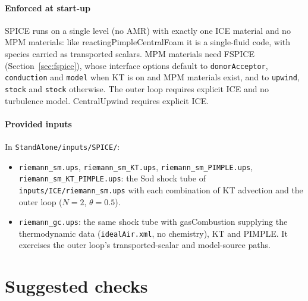 \documentclass[11pt]{article}
\newcommand{\code}[1]{\texttt{\small #1}}
\newcommand{\file}[1]{\texttt{\small\color{Moss}#1}}
\begin{document}
\paragraph{Enforced at start-up}
SPICE runs on a single level (no AMR) with exactly one ICE material and no MPM materials: like
reactingPimpleCentralFoam it is a single-fluid code, with species carried as transported scalars.
MPM materials need FSPICE (Section~\ref{sec:fspice}), whose interface options default to
\code{donorAcceptor}, \code{conduction} and \code{model} when KT is on and MPM materials exist,
and to \code{upwind}, \code{stock} and \code{stock} otherwise.
The outer loop requires explicit ICE and no turbulence model. CentralUpwind requires explicit ICE.

\paragraph{Provided inputs} In \file{StandAlone/inputs/SPICE/}:
\begin{itemize}
  \item \code{riemann\_sm.ups}, \code{riemann\_sm\_KT.ups}, \code{riemann\_sm\_PIMPLE.ups},
        \code{riemann\_sm\_KT\_PIMPLE.ups}: the Sod shock tube of \file{inputs/ICE/riemann\_sm.ups}
        with each combination of KT advection and the outer loop ($N=2$, $\theta=0.5$).
  \item \code{riemann\_gc.ups}: the same shock tube with gasCombustion supplying the
        thermodynamic data (\code{idealAir.xml}, no chemistry), KT and PIMPLE. It exercises the
        outer loop's transported-scalar and model-source paths.
\end{itemize}

\section{Suggested checks}
\end{document}
